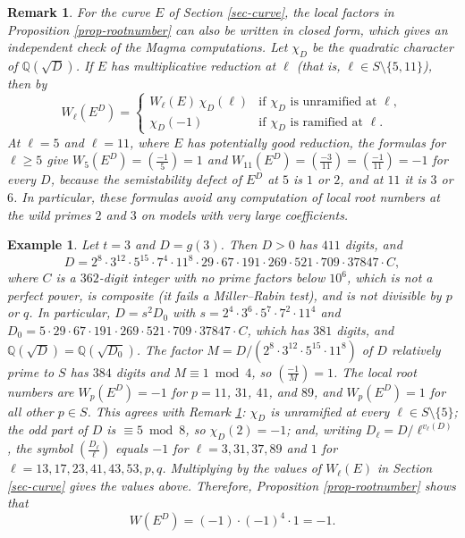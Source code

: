 \documentclass[11pt]{amsart}
\newtheorem{remark}[defn]{Remark}
\newtheorem{example}[defn]{Example}
\newcommand{\Q}{\mathbb Q}
\newcommand{\kron}[2]{\left(\frac{#1}{#2}\right)}
\begin{document}
\begin{remark}\label{rem-closedform}
For the curve $E$ of Section \ref{sec-curve}, the local factors in Proposition \ref{prop-rootnumber} can also be written in closed form, which gives an independent check of the Magma computations. Let $\chi_D$ be the quadratic character of $\Q(\sqrt{D})$. If $E$ has multiplicative reduction at $\ell$ (that is, $\ell\in S\setminus\{5,11\}$), then by \cite{rohrlichvariation}
$$W_\ell(E^D)=\begin{cases} W_\ell(E)\,\chi_D(\ell) & \text{if } \chi_D \text{ is unramified at } \ell,\\ \chi_D(-1) & \text{if } \chi_D \text{ is ramified at } \ell.\end{cases}$$
At $\ell=5$ and $\ell=11$, where $E$ has potentially good reduction, the formulas for $\ell\geq 5$ give $W_5(E^D)=\kron{-1}{5}=1$ and $W_{11}(E^D)=\kron{-3}{11}=\kron{-1}{11}=-1$ for every $D$, because the semistability defect of $E^D$ at $5$ is $1$ or $2$, and at $11$ it is $3$ or $6$. In particular, these formulas avoid any computation of local root numbers at the wild primes $2$ and $3$ on models with very large coefficients.
\end{remark}


\begin{example}\label{ex-t3}
Let $t=3$ and $D=g(3)$. Then $D>0$ has $411$ digits, and
$$D=2^8\cdot 3^{12}\cdot 5^{15}\cdot 7^4\cdot 11^{8}\cdot 29\cdot 67\cdot 191\cdot 269\cdot 521\cdot 709\cdot 37847\cdot C,$$
where $C$ is a $362$-digit integer with no prime factors below $10^6$, which is not a perfect power, is composite (it fails a Miller--Rabin test), and is not divisible by $p$ or $q$. In particular, $D=s^2D_0$ with $s=2^4\cdot 3^6\cdot 5^7\cdot 7^2\cdot 11^4$ and $D_0=5\cdot 29\cdot 67\cdot 191\cdot 269\cdot 521\cdot 709\cdot 37847\cdot C$, which has $381$ digits, and $\Q(\sqrt{D})=\Q(\sqrt{D_0})$. The factor  $M=D/(2^8\cdot 3^{12}\cdot 5^{15}\cdot 11^8)$ of $D$ relatively prime to $S$ has $384$ digits and $M\equiv 1\bmod 4$, so $\kron{-1}{M}=1$. The local root numbers are $W_p(E^D)=-1$ for $p=11$, $31$, $41$, and $89$, and $W_p(E^D)=1$ for all other $p\in S$. This agrees with Remark \ref{rem-closedform}: $\chi_D$ is unramified at every $\ell\in S\setminus\{5\}$; the odd part of $D$ is $\equiv 5\bmod 8$, so $\chi_D(2)=-1$; and, writing $D_\ell=D/\ell^{v_\ell(D)}$, the symbol $\kron{D_\ell}{\ell}$ equals $-1$ for $\ell=3,31,37,89$ and $1$ for $\ell=13,17,23,41,43,53,p,q$. Multiplying by the values of $W_\ell(E)$ in Section \ref{sec-curve} gives the values above. Therefore, Proposition \ref{prop-rootnumber} shows that
$$W(E^D)=(-1)\cdot(-1)^4\cdot 1=-1.$$
\end{example}
\end{document}
